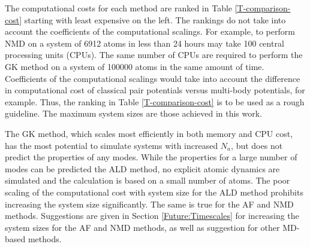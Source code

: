 The computational costs for each method are ranked in 
Table \ref{T-comparison-cost} starting with least 
expensive on the left. 
The rankings do not take into account the 
coefficients of the computational 
scalings. For example, to perform NMD on a system 
of 6912 atoms in less 
than 24 hours may take 100 central processing 
units (CPUs).  
The same number of 
CPUs are required 
to perform the GK method on a system of 
100000 atoms in the same amount of 
time. Coefficients of the computational scalings would take into 
account the difference in computational cost of classical pair 
potentials versus multi-body potentials, for example. 
Thus, the ranking in Table \ref{T-comparison-cost} is to be used as a 
rough guideline. The maximum system 
sizes are those achieved in this work.  

The GK method, which scales most efficiently in both memory and CPU 
cost, has the most potential to simulate systems with increased 
$N_a$, but does not predict the properties of any modes. 
While the properties for a large number of modes 
can be predicted the ALD method, 
no explicit atomic dynamics are simulated and the calculation is based 
on a small number of atoms. The poor scaling of the 
computational cost with system size for the ALD method prohibits 
increasing the system size significantly. The same is true for the 
AF and NMD methods. Suggestions are given in 
Section \ref{Future:Timescales} for increasing the system sizes for the 
AF and NMD methods, as well as suggestion for other MD-based methods.

